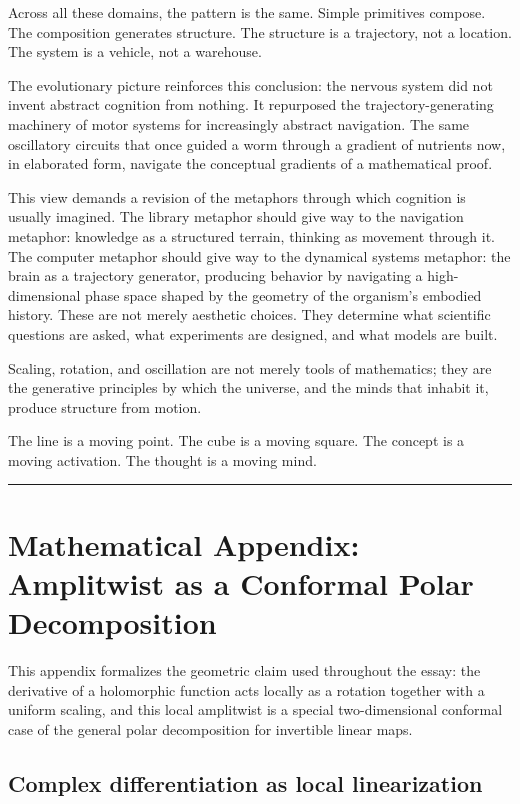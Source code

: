 \documentclass[11pt, a4paper]{article}
\theoremstyle{plain}
\theoremstyle{definition}
\theoremstyle{remark}
\begin{document}
Across all these domains, the pattern is the same. Simple primitives compose. The
composition generates structure. The structure is a trajectory, not a location.
The system is a vehicle, not a warehouse.

The evolutionary picture reinforces this conclusion: the nervous system did not invent
abstract cognition from nothing. It repurposed the trajectory-generating machinery of
motor systems for increasingly abstract navigation. The same oscillatory circuits that
once guided a worm through a gradient of nutrients now, in elaborated form, navigate
the conceptual gradients of a mathematical proof.

This view demands a revision of the metaphors through which cognition is usually
imagined. The library metaphor should give way to the navigation metaphor: knowledge as
a structured terrain, thinking as movement through it. The computer metaphor should give
way to the dynamical systems metaphor: the brain as a trajectory generator, producing
behavior by navigating a high-dimensional phase space shaped by the geometry of the
organism's embodied history. These are not merely aesthetic choices. They determine what
scientific questions are asked, what experiments are designed, and what models are built.

Scaling, rotation, and oscillation are not merely tools of mathematics; they are the
generative principles by which the universe, and the minds that inhabit it, produce
structure from motion.

The line is a moving point. The cube is a moving square. The concept is a moving
activation. The thought is a moving mind.

\bigskip
\noindent\rule{\textwidth}{0.4pt}
\bigskip


\appendix
\section{Mathematical Appendix: Amplitwist as a Conformal Polar Decomposition}

This appendix formalizes the geometric claim used throughout the essay: the derivative
of a holomorphic function acts locally as a rotation together with a uniform scaling,
and this local amplitwist is a special two-dimensional conformal case of the general
polar decomposition for invertible linear maps.

\subsection{Complex differentiation as local linearization}
\end{document}
